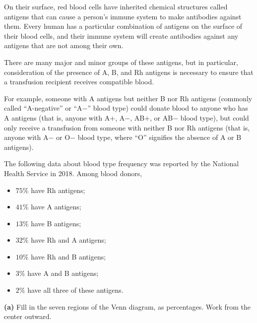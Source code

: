 \documentclass[12pt]{ximera}
\begin{document}
\begin{problem}
On their surface, red blood cells have inherited chemical structures called antigens
that can cause a person's immune system to make antibodies against them. Every human
has a particular combination of antigens on the surface of their blood cells, and
their immune system will create antibodies against any antigens that are not among
their own.

There are many major and minor groups of these antigens, but in particular,
consideration of the presence of A, B, and Rh antigens is necessary to ensure that a
transfusion recipient receives compatible blood.

For example, someone with A antigens but neither B nor Rh antigens (commonly called
``A-negative'' or ``A$-$'' blood type) could donate blood to anyone who has A
antigens (that is, anyone with A$+$, A$-$, AB$+$, or AB$-$ blood type), but could
only receive a transfusion from someone with neither B nor Rh antigens (that is,
anyone with A$-$ or O$-$ blood type, where ``O'' signifies the absence of A or B
antigens).

The following data about blood type frequency was reported by the National Health
Service in 2018. Among blood donors,
\begin{itemize}
    \item $75\%$ have Rh antigens;
    \item $41\%$ have A antigens;
    \item $13\%$ have B antigens;
    \item $32\%$ have Rh and A antigens;
    \item $10\%$ have Rh and B antigens;
    \item $3\%$ have A and B antigens;
    \item $2\%$ have all three of these antigens.
\end{itemize}

\begin{prompt}
\textbf{(a)} Fill in the seven regions of the Venn diagram, as percentages. Work
from the center outward.

\begin{center}
\end{center}


\end{prompt}
\end{problem}
\end{document}
